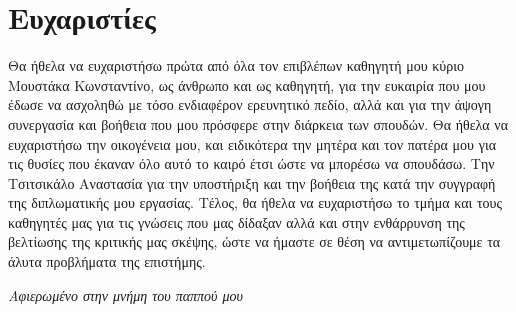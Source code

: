 \section*{Ευχαριστίες}

Θα ήθελα να ευχαριστήσω πρώτα από όλα τον επιβλέπων καθηγητή μου κύριο Μουστάκα Κωνσταντίνο, ως άνθρωπο και ως καθηγητή, για την ευκαιρία που μου έδωσε να ασχοληθώ με τόσο ενδιαφέρον ερευνητικό πεδίο, αλλά και για την άψογη συνεργασία και βοήθεια που μου πρόσφερε στην διάρκεια των σπουδών. Θα ήθελα να ευχαριστήσω την οικογένεια μου, και ειδικότερα την μητέρα και τον πατέρα μου για τις θυσίες που έκαναν όλο αυτό το καιρό έτσι ώστε να μπορέσω να σπουδάσω. Την Τσιτσικάλο Αναστασία για την υποστήριξη και την βοήθεια της κατά την συγγραφή της διπλωματικής μου εργασίας. Τέλος, θα ήθελα να ευχαριστήσω το τμήμα και τους καθηγητές μας για τις γνώσεις που μας δίδαξαν αλλά και στην ενθάρρυνση της βελτίωσης της κριτικής μας σκέψης, ώστε να ήμαστε σε θέση να αντιμετωπίζουμε τα άλυτα προβλήματα της επιστήμης.

\thispagestyle{empty}
\clearpage

\begin{center}
  \null\vfill
  \large{{\em Αφιερωμένο στην μνήμη του παππού μου}}
  \vspace{2cm}
  \null\vfill
\end{center}

\thispagestyle{empty} 